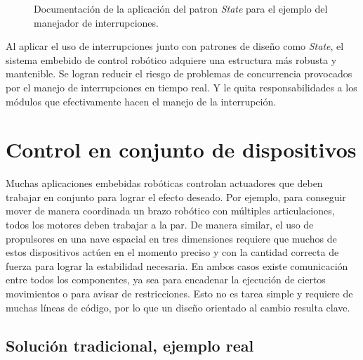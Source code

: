 \begin{figure}
\caption{Documentación de la aplicación del patron \textit{State} para el ejemplo del manejador de interrupciones.}
\label{docStateInt}
\end{figure}


Al aplicar el uso de interrupciones junto con patrones de diseño como \textit{State}, el sistema embebido de control robótico adquiere una estructura más robusta y mantenible. Se logran reducir el riesgo de problemas de concurrencia provocados por el manejo de interrupciones en tiempo real. Y le quita responsabilidades a los módulos que efectivamente hacen el manejo de la interrupción.



\section{Control en conjunto de dispositivos}
Muchas aplicaciones embebidas robóticas controlan \gls{actuadores} que deben trabajar en conjunto para lograr el efecto deseado. Por ejemplo, para conseguir mover de manera coordinada un brazo robótico con múltiples articulaciones, todos los motores deben trabajar a la par. De manera similar, el uso de propulsores en una nave espacial en tres dimensiones requiere que muchos de estos dispositivos actúen en el momento preciso y con la cantidad correcta de fuerza para lograr la estabilidad necesaria. En ambos casos existe comunicación entre todos los componentes, ya sea para encadenar la ejecución de ciertos movimientos o para avisar de restricciones. Esto no es tarea simple y requiere de muchas líneas de código, por lo que un diseño orientado al cambio resulta clave.

\subsection*{Solución tradicional, ejemplo real}

